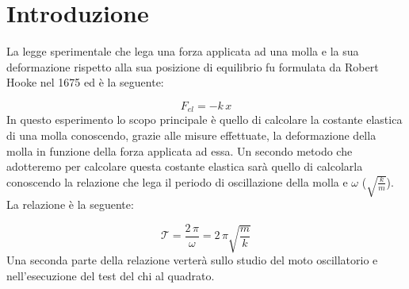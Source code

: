 \section{Introduzione}
La legge sperimentale che lega una forza applicata ad una molla e la sua deformazione rispetto alla sua posizione di equilibrio fu formulata da Robert Hooke nel 1675 ed è la seguente:

\begin{equation}
	F_{el} = -k\,x
	\label{hooke}
\end{equation}
In questo esperimento lo scopo principale è quello di calcolare la costante elastica di una molla conoscendo, grazie alle misure effettuate, la deformazione della molla in funzione della forza applicata ad essa. Un secondo metodo che adotteremo per calcolare questa costante elastica sarà quello di calcolarla conoscendo la relazione che lega il periodo di oscillazione della molla e $\omega$ ($\sqrt{\frac{k}{m}}$). La relazione è la seguente:

\begin{equation}
	\mathcal{T} = \frac{2\,\pi}{\omega} = {2\,\pi}{\sqrt{\frac{m}{k}}}
\end{equation}
Una seconda parte della relazione verterà sullo studio del moto oscillatorio e nell'esecuzione del test del chi al quadrato.